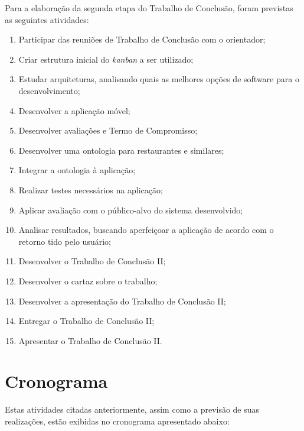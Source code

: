 Para a elaboração da segunda etapa do Trabalho de Conclusão, foram previstas as seguintes atividades:
\begin{enumerate}
    \item \label{tsk:reunioes_tcii}Participar das reuniões de Trabalho de Conclusão com o orientador;
    \item \label{tsk:kanban}Criar estrutura inicial do \emph{kanban} a ser utilizado;
    \item \label{tsk:arquitetura}Estudar arquiteturas, analisando quais as melhores opções de software para o desenvolvimento;
    \item \label{tsk:desenv_app}Desenvolver a aplicação móvel;
    \item \label{tsk:desenv_avaliacao}Desenvolver avaliações e Termo de Compromisso;
    \item \label{tsk:desenv_ontologia}Desenvolver uma ontologia para restaurantes e similares;
    \item \label{tsk:integr_ontologia}Integrar a ontologia à aplicação;
    \item \label{tsk:testes}Realizar testes necessários na aplicação;
    \item \label{tsk:app_avaliacao}Aplicar avaliação com o público-alvo do sistema desenvolvido;
    \item \label{tsk:ver_resultados}Analisar resultados, buscando aperfeiçoar a aplicação de acordo com o retorno tido pelo usuário;
    \item \label{tsk:desenv_tcii}Desenvolver o Trabalho de Conclusão II;
    \item \label{tsk:desenv_cartaz}Desenvolver o cartaz sobre o trabalho;
    \item \label{tsk:desenv_apres}Desenvolver a apresentação do Trabalho de Conclusão II;
    \item \label{tsk:entr_tcii}Entregar o Trabalho de Conclusão II;
    \item \label{tsk:apres_tcii}Apresentar o Trabalho de Conclusão II.
\end{enumerate}

\section{Cronograma}
Estas atividades citadas anteriormente, assim como a previsão de suas realizações, estão exibidas no cronograma apresentado abaixo:


